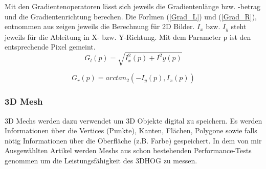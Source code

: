 Mit den Gradientenoperatoren lässt sich jeweils die Gradientenlänge bzw. -betrag und die Gradientenrichtung berechen. Die Forlmen (\ref{Grad_L}) und (\ref{Grad_R}), entnommen aus \cite{Priese15} zeigen jeweils die Berechnung für 2D Bilder. $I_x$ bzw. $I_y$ steht jeweils für die Ableitung in X- bzw. Y-Richtung. Mit dem Parameter p ist den entsprechende Pixel gemeint.
\begin{equation}
\label{Grad_L}
G_l(p) = \sqrt{I^2_x(p)+ I^2 y(p)}
\end{equation}

\begin{equation}
\label{Grad_R}
G_r(p) = arctan_2(- I_y(p),I_x(p))
\end{equation}


\subsubsection{3D Mesh}
3D Mechs werden dazu verwendet um 3D Objekte digital zu speichern. Es werden Informationen über die Vertices (Punkte), Kanten, Flächen, Polygone sowie falls nötig Informationen über die Oberfläche (z.B. Farbe) gespeichert. In dem von mir Ausgewählten Artikel \cite{scherer2010histograms} werden Meshs aus schon bestehenden Performance-Tests genommen um die Leistungsfähigkeit des 3DHOG zu messen.